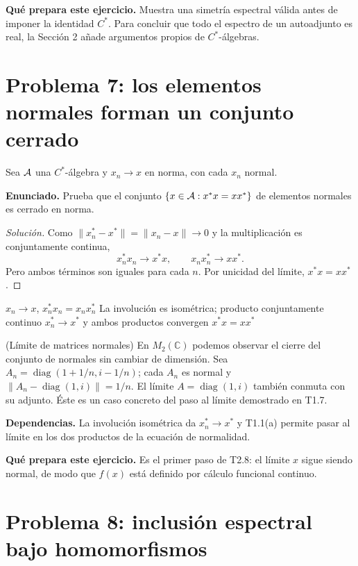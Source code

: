 \noindent\textbf{Qué prepara este ejercicio.} Muestra una simetría espectral válida antes de imponer la identidad $C^*$. Para concluir que todo el espectro de un autoadjunto es real, la Sección 2 añade argumentos propios de $C^*$-álgebras.

\section{Problema 7: los elementos normales forman un conjunto cerrado}

Sea $\mathcal A$ una $C^*$-álgebra y $x_n\to x$ en norma, con cada $x_n$ normal.

\noindent\textbf{Enunciado.} Prueba que el conjunto $\{x\in\mathcal A:x^*x=xx^*\}$ de elementos normales es cerrado en norma.

\begin{proof}[Solución]
Como $\|x_n^*-x^*\|=\|x_n-x\|\to0$ y la multiplicación es conjuntamente continua,
\[
 x_n^*x_n\to x^*x,
 \qquad
 x_nx_n^*\to xx^*.
\]
Pero ambos términos son iguales para cada $n$. Por unicidad del límite, $x^*x=xx^*$.
\end{proof}

\proofdiagram
{$x_n\to x$, $x_n^*x_n=x_nx_n^*$}
{La involución es isométrica; producto conjuntamente continuo}
{$x_n^*\to x^*$ y ambos productos convergen}
{$x^*x=xx^*$}

\begin{cthejemplo}{(Límite de matrices normales)}
En $M_2(\mathbb C)$ podemos observar el cierre del conjunto de normales sin cambiar de dimensión.
Sea $A_n=\operatorname{diag}(1+1/n,i-1/n)$; cada $A_n$ es normal y
$\|A_n-\operatorname{diag}(1,i)\|=1/n$.
El límite $A=\operatorname{diag}(1,i)$ también conmuta con su adjunto.
Éste es un caso concreto del paso al límite demostrado en T1.7.
\end{cthejemplo}

\noindent\textbf{Dependencias.} La involución isométrica da $x_n^*\to x^*$ y T1.1(a) permite pasar al límite en los dos productos de la ecuación de normalidad.

\noindent\textbf{Qué prepara este ejercicio.} Es el primer paso de T2.8: el límite $x$ sigue siendo normal, de modo que $f(x)$ está definido por cálculo funcional continuo.

\section{Problema 8: inclusión espectral bajo homomorfismos}

